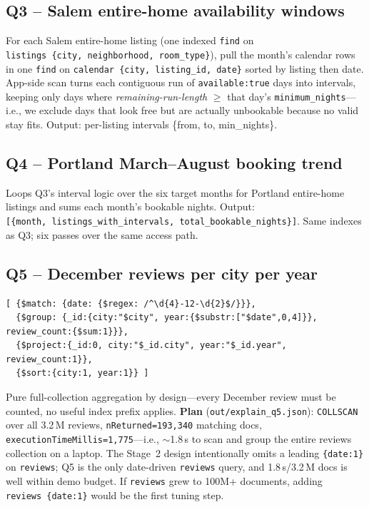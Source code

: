 \documentclass[10pt]{article}
\begin{document}
\subsection{Q3 -- Salem entire-home availability windows}
For each Salem entire-home listing (one indexed \texttt{find} on \texttt{listings~\{city,~neighborhood,~room\_type\}}), pull the month's calendar rows in one \texttt{find} on \texttt{calendar~\{city,~listing\_id,~date\}} sorted by listing then date. App-side scan turns each contiguous run of \texttt{available:true} days into intervals, keeping only days where \emph{remaining-run-length} $\geq$ that day's \texttt{minimum\_nights}---i.e., we exclude days that look free but are actually unbookable because no valid stay fits. Output: per-listing intervals \{from, to, min\_nights\}.

\subsection{Q4 -- Portland March--August booking trend}
Loops Q3's interval logic over the six target months for Portland entire-home listings and sums each month's bookable nights. Output: \texttt{[\{month,~listings\_with\_intervals,~total\_bookable\_nights\}]}. Same indexes as Q3; six passes over the same access path.

\subsection{Q5 -- December reviews per city per year}
\begin{lstlisting}
[ {$match: {date: {$regex: /^\d{4}-12-\d{2}$/}}},
  {$group: {_id:{city:"$city", year:{$substr:["$date",0,4]}}, review_count:{$sum:1}}},
  {$project:{_id:0, city:"$_id.city", year:"$_id.year", review_count:1}},
  {$sort:{city:1, year:1}} ]
\end{lstlisting}
Pure full-collection aggregation by design---every December review must be counted, no useful index prefix applies. \textbf{Plan} (\texttt{out/explain\_q5.json}): \texttt{COLLSCAN} over all 3.2\,M reviews, \texttt{nReturned=193{,}340} matching docs, \texttt{executionTimeMillis=1{,}775}---i.e., $\sim$1.8\,s to scan and group the entire reviews collection on a laptop. The Stage~2 design intentionally omits a leading \texttt{\{date:1\}} on \texttt{reviews}; Q5 is the only date-driven \texttt{reviews} query, and 1.8\,s/3.2\,M docs is well within demo budget. If \texttt{reviews} grew to 100M+ documents, adding \texttt{reviews~\{date:1\}} would be the first tuning step.
\end{document}
